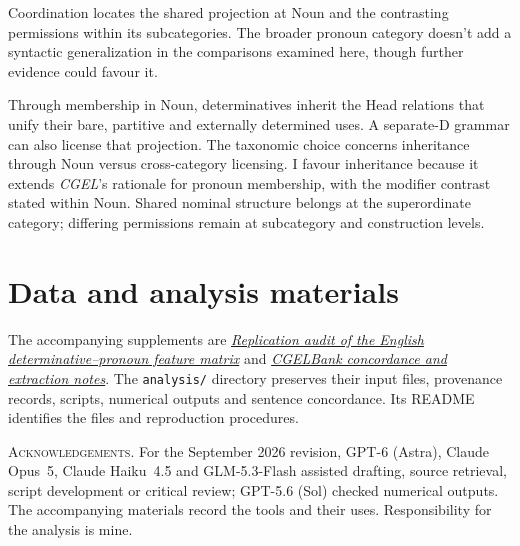 \documentclass[12pt]{article}
\begin{document}
Coordination locates the shared projection at Noun and the contrasting permissions within its subcategories. The broader pronoun category doesn't add a syntactic generalization in the comparisons examined here, though further evidence could favour it.

Through membership in Noun, determinatives inherit the Head relations that unify their bare, partitive and externally determined uses. A separate-D grammar can also license that projection. The taxonomic choice concerns inheritance through Noun versus cross-category licensing. I favour inheritance because it extends \textit{CGEL}'s rationale for pronoun membership, with the modifier contrast stated within Noun. Shared nominal structure belongs at the superordinate category; differing permissions remain at subcategory and construction levels.

\section*{Data and analysis materials}

The accompanying supplements are \href{run:matrix-audit.pdf}{\textit{Replication audit of the English determinative--pronoun feature matrix}} and \href{run:corpus-documentation.pdf}{\textit{CGELBank concordance and extraction notes}}. The \texttt{analysis/} directory preserves their input files, provenance records, scripts, numerical outputs and sentence concordance. Its README identifies the files and reproduction procedures.

\vspace{0.5\baselineskip}
\noindent\textsc{Acknowledgements.} For the September 2026 revision, GPT-6 (Astra), Claude Opus~5, Claude Haiku~4.5 and GLM-5.3-Flash assisted drafting, source retrieval, script development or critical review; GPT-5.6 (Sol) checked numerical outputs. The accompanying materials record the tools and their uses. Responsibility for the analysis is mine.

\clearpage
\printbibliography
\end{document}
